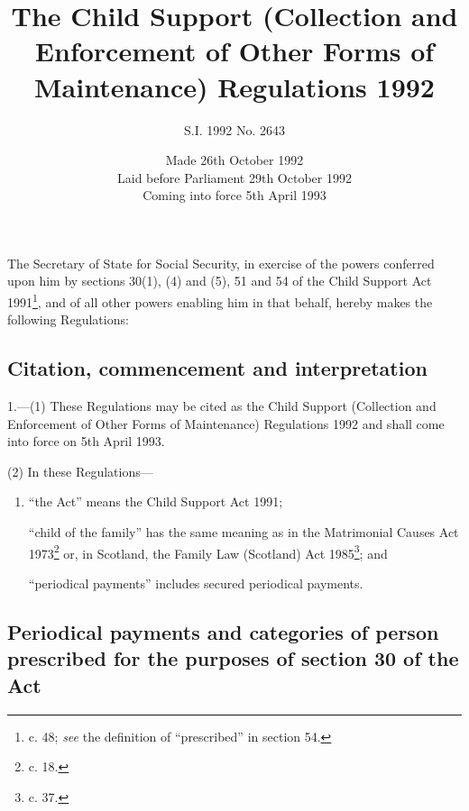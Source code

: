 \documentclass[a4paper]{article}
\title{The Child Support (Collection and Enforcement of Other Forms of Maintenance) Regulations 1992}
\author{S.I. 1992 No. 2643}
\date{Made 26th October 1992\\Laid before Parliament 29th October 1992\\Coming into force 5th April 1993}
\begin{document}
\maketitle

\noindent
The Secretary of State for Social Security, in exercise of the powers conferred upon him by sections 30(1), (4) and (5), 51 and 54 of the Child Support Act 1991\footnote{ c. 48; \emph{see} the definition of “prescribed” in section 54.}, and of all other powers enabling him in that behalf, hereby makes the following Regulations:

{\sloppy

\tableofcontents

}

\setcounter{secnumdepth}{-2}

\subsection[1. Citation, commencement and interpretation]{Citation, commencement and interpretation}

1.—(1) These Regulations may be cited as the Child Support (Collection and Enforcement of Other Forms of Maintenance) Regulations 1992 and shall come into force on 5th April 1993.

(2) In these Regulations—
\begin{enumerate}\item[]
“the Act” means the Child Support Act 1991;

“child of the family” has the same meaning as in the Matrimonial Causes Act 1973\footnote{ c. 18.} or, in Scotland, the Family Law (Scotland) Act 1985\footnote{ c. 37.}; and

“periodical payments” includes secured periodical payments.
\end{enumerate}

\subsection[2. Periodical payments and categories of person prescribed for the purposes of section 30 of the Act]{Periodical payments and categories of person prescribed for the purposes of section 30 of the Act}
\end{document}
